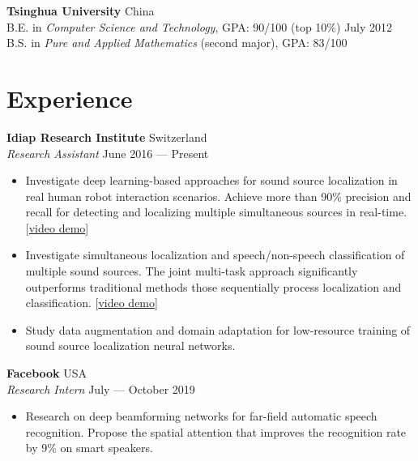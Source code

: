 \documentclass[a4paper,9pt]{extarticle} %
\newcommand{\ind}{\hspace*{1em}}
\begin{document}
\textbf{Tsinghua University} \hfill China \\
\ind{} B.E. in \textit{Computer Science and Technology}, GPA\@: 90/100 (top 10\%) \hfill July 2012 \\
\ind{} B.S. in \textit{Pure and Applied Mathematics} (second major), GPA\@: 83/100 %


\section{Experience}

\textbf{Idiap Research Institute}  \hfill Switzerland \\
\textit{Research Assistant} \hfill June 2016 --- Present%
\vspace{-.9\parskip}
\begin{itemize}
  \item Investigate deep learning-based approaches for sound source localization in real human robot interaction scenarios.
        Achieve more than 90\% precision and recall for detecting and localizing multiple simultaneous sources in real-time.
        [\href{https://www.youtube.com/watch?v=_4EwuVlE_pU}{video demo}]
  \item Investigate simultaneous localization and speech/non-speech classification of multiple sound sources.
        The joint multi-task approach significantly outperforms traditional methods those sequentially process localization and classification.
        [\href{https://www.youtube.com/watch?v=O7bQvg03RTc}{video demo}]
  \item Study data augmentation and domain adaptation for low-resource training of sound source localization neural networks.
\end{itemize}


\textbf{Facebook}  \hfill USA \\
\textit{Research Intern} \hfill July --- October 2019%
\vspace{-.9\parskip}
\begin{itemize}
  \item Research on deep beamforming networks for far-field automatic speech recognition.
        Propose the spatial attention that improves the recognition rate by 9\% on smart speakers.
\end{itemize}
\end{document}
